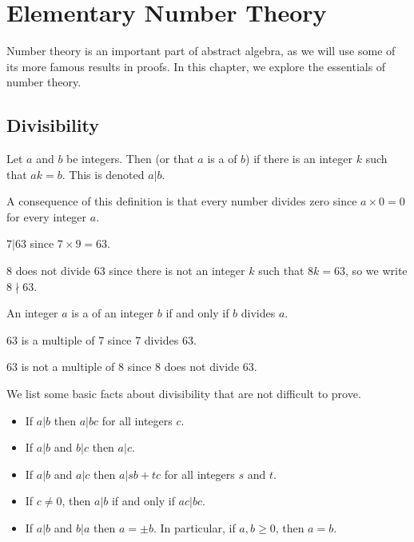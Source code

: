 \chapter{Elementary Number Theory}
Number theory is an important part of abstract algebra, as we will use some of its more famous results in proofs. In this chapter, we explore the essentials of number theory.

\section{Divisibility}
\begin{definition}
    Let $a$ and $b$ be integers. Then  (or that $a$ is a  of $b$) if there is an integer $k$ such that $ak = b$. This is denoted $a\vert b$.
\end{definition}
\begin{remark}
    A consequence of this definition is that every number divides zero since $a \times 0 = 0$ for every integer $a$.
\end{remark}

\begin{example}
    $7\vert 63$ since $7 \times 9 = 63$.
\end{example}

\begin{example}
    8 does not divide 63 since there is not an integer $k$ such that $8k = 63$, so we write $8 \nmid 63$.
\end{example}

\begin{definition}
    An integer $a$ is a  of an integer $b$ if and only if $b$ divides $a$.
\end{definition}

\begin{example}
    63 is a multiple of 7 since 7 divides 63.
\end{example}

\begin{example}
    63 is not a multiple of 8 since 8 does not divide 63.
\end{example}

We list some basic facts about divisibility that are not difficult to prove.
\begin{itemize}
    \item If $a\vert b$ then $a\vert bc$ for all integers $c$.
    \item If $a\vert b$ and $b\vert c$ then $a\vert c$.
    \item If $a\vert b$ and $a\vert c$ then $a\vert sb+tc$ for all integers $s$ and $t$.
    \item If $c \neq 0$, then $a\vert b$ if and only if $ac\vert bc$.
    \item If $a \vert b$ and $b \vert a$ then $a = \pm b$. In particular, if $a,b\geq 0$, then $a = b$.
\end{itemize}

